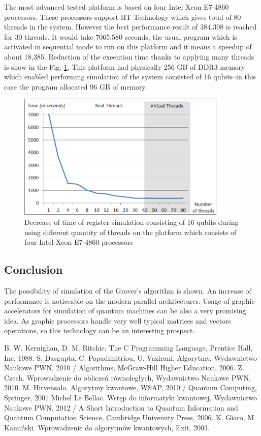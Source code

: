 \documentclass[10pt, a5paper]{article}
\begin{document}
The most advanced tested platform is based on four Intel Xeon E7-4860 processors. These processors support HT Technology which gives total of 80 threads in the system. However the best performance result of 384,308 is reached for 30 threads. It would take 7065,580 seconds, the usual program which is activated in sequential mode to run on this platform and it means a speedup of about 18,385. Reduction of the execution time thanks to applying many threads is show in the Fig. \ref{fig:lf3}. This platform had physically 256 GB of DDR3 memory which enabled performing simulation of the system consisted of 16 qubits--in this case the program allocated 96 GB of memory.

\begin{figure}
  \centering
  \includegraphics[width=10cm]{18_2012_3b.png}
\caption{Decrease of time of register simulation consisting of 16 qubits during using different quantity of threads on the platform which consists of four  Intel Xeon E7-4860 processors}
\label{fig:lf3}
\end{figure}

\subsection*{Conclusion}

The possibility of simulation of the Grover's algorithm is shown. An increase of performance is noticeable on the modern parallel architectures. Usage of graphic accelerators for simulation of quantum machines can be also a very promising idea. As graphic processors handle very well typical matrices and vectors operations, so this technology can be an interesting prospect.

\begin{thebibliography}{9}
   B. W. Kernighan, D. M. Ritchie. The C Programming Language, Prentice Hall, Inc, 1988.
   S. Dasgupta, C. Papadimitriou, U. Vazirani. Algorytmy, Wydawnictwo Naukowe PWN, 2010 / Algorithms, McGraw-Hill Higher Education, 2006.
   Z. Czech. Wprowadzenie do obliczeń równoległych, Wydawnictwo Naukowe PWN, 2010.
   M. Hirvensalo. Algorytmy kwantowe, WSAP, 2010 / Quantum Computing, Springer, 2001
   Michel Le Bellac. Wstęp do informatyki kwantowej, Wydawnictwo Naukowe PWN, 2012 / A Short Introduction to Quantum Information and Quantum Computation Science, Cambridge University Press, 2006.
   K. Giaro, M. Kamiński. Wprowadzenie do algorytmów kwantowych, Exit, 2003.
\end{thebibliography}
\end{document}
